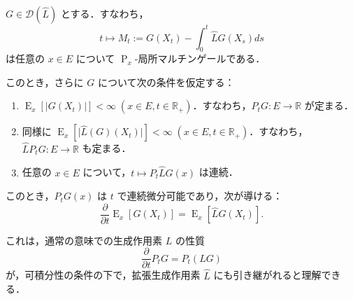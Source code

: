 \documentclass[
]{article}
\providecommand{\tightlist}{%
  \setlength{\itemsep}{0pt}\setlength{\parskip}{0pt}}\usepackage{longtable,booktabs,array}
\renewcommand{\labelenumi}{(\arabic{enumi})} %
\begin{document}
\begin{tcolorbox}[enhanced jigsaw, opacitybacktitle=0.6, colback=white, breakable, toptitle=1mm, titlerule=0mm, left=2mm, colframe=quarto-callout-tip-color-frame, title={命題}, colbacktitle=quarto-callout-tip-color!10!white, coltitle=black, bottomtitle=1mm, arc=.35mm, leftrule=.75mm, bottomrule=.15mm, rightrule=.15mm, opacityback=0, toprule=.15mm]

\(G\in\mathcal{D}(\widehat{L})\) とする．すなわち， \[
t\mapsto M_t:=G(X_t)-\int^t_0\widehat{L}G(X_s)ds
\] は任意の \(x\in E\) について
\(\operatorname{P}_x\)-局所マルチンゲールである．

このとき，さらに \(G\) について次の条件を仮定する：

\begin{enumerate}
\def\labelenumi{\arabic{enumi}.}
\tightlist
\item
  \(\operatorname{E}_x[\lvert G(X_t)\rvert]<\infty\;(x\in E,t\in\mathbb{R}_+)\)．すなわち，\(P_tG:E\to\mathbb{R}\)
  が定まる．
\item
  同様に
  \(\operatorname{E}_x[\lvert\widehat{L}(G)(X_t)\rvert]<\infty\;(x\in E,t\in\mathbb{R}_+)\)．すなわち，\(\widehat{L}P_tG:E\to\mathbb{R}\)
  も定まる．\footnotemark{}
\item
  任意の \(x\in E\) について，\(t\mapsto P_t\widehat{L}G(x)\) は連続．
\end{enumerate}

このとき，\(P_tG(x)\) は \(t\) で連続微分可能であり，次が導ける： \[
\frac{\partial }{\partial t}\operatorname{E}_x[G(X_t)]=\operatorname{E}_x[\widehat{L}G(X_t)].
\]

\end{tcolorbox}


これは，通常の意味での生成作用素 \(L\) の性質 \[
\frac{\partial }{\partial t}P_tG=P_t(LG)
\] が，可積分性の条件の下で，拡張生成作用素 \(\widehat{L}\)
にも引き継がれると理解できる．
\end{document}
